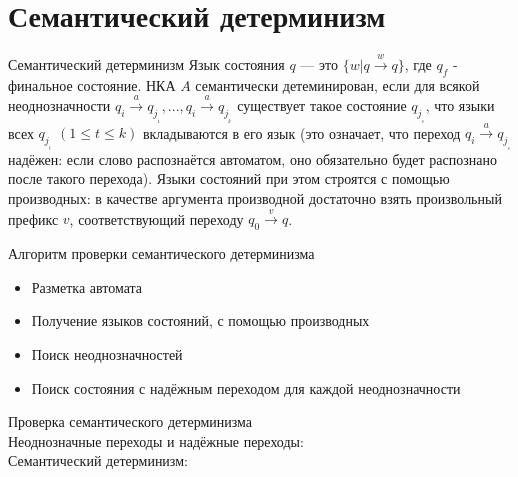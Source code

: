 \section{Семантический детерминизм}
\begin{frame}{Семантический детерминизм}
    \vspace{-5pt}
     Язык состояния $q$ — это $\{w | q \xrightarrow{\text{$w$}} q\}$, где $q_f$  - финальное состояние. НКА $A$ семантически детеминирован, если для всякой неоднозначности $q_i \xrightarrow{\text{$a$}} {q_j__1} , ..., {q_i \xrightarrow{\text{$a$}} q_j__k}$ существует такое состояние $q_j__s$, что языки всех  $q_j__t$ $(1 \leqslant t \leqslant k)$ вкладываются в его язык (это означает, что переход $q_i \xrightarrow{\text{$a$}} {q_j__s}$ надёжен: если слово распознаётся автоматом, оно обязательно будет распознано после такого перехода).
     Языки состояний при этом строятся с помощью производных: в качестве аргумента производной достаточно взять произвольный префикс $v$, соответствующий переходу $q_0 \xrightarrow{\text{$v$}} q$.
\end{frame} %
\begin{frame}{Алгоритм проверки семантического детерминизма}
    \vspace{-5pt}
    \begin{itemize}
        \item Разметка автомата
        \item Получение языков состояний, с помощью производных
        \item Поиск неоднозначностей
        \item Поиск состояния с надёжным переходом для каждой неоднозначности
    \end{itemize}
    
\end{frame}
\begin{frame}{Проверка семантического детерминизма}
    \vspace{-5pt}
    \\Неоднозначные переходы и надёжные переходы:
    \\Семантический детерминизм:
\end{frame}